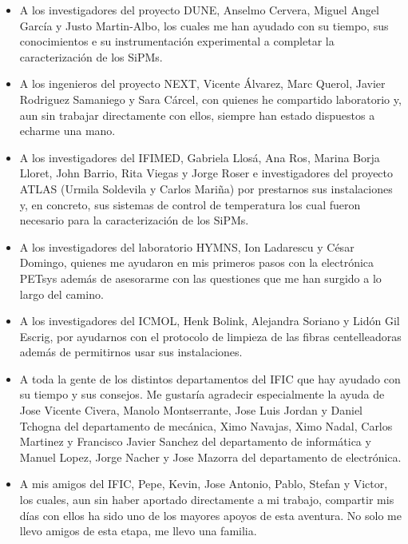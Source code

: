 \begin{itemize}

\item{} A los investigadores del proyecto DUNE, Anselmo Cervera, Miguel Angel García y Justo Martin-Albo, los cuales me han ayudado con su tiempo, sus conocimientos e su instrumentación experimental a completar la caracterización de los SiPMs. 

\item{} A los ingenieros del proyecto NEXT, Vicente Álvarez, Marc Querol, Javier Rodriguez Samaniego y Sara Cárcel, con quienes he compartido laboratorio y, aun sin trabajar directamente con ellos, siempre han estado dispuestos a echarme una mano. 

\item{} A los investigadores del IFIMED, Gabriela Llosá, Ana Ros, Marina Borja Lloret, John Barrio, Rita Viegas y Jorge Roser e investigadores del proyecto ATLAS (Urmila Soldevila y Carlos Mariña) por prestarnos sus instalaciones y, en concreto, sus sistemas de control de temperatura los cual fueron necesario para la caracterización de los SiPMs. 

\item{} A los investigadores del laboratorio HYMNS, Ion Ladarescu y César Domingo, quienes me ayudaron en mis primeros pasos con la electrónica PETsys además de asesorarme con las questiones que me han surgido a lo largo del camino.

\item{} A los investigadores del ICMOL, Henk Bolink, Alejandra Soriano y Lidón Gil Escrig, por ayudarnos con el protocolo de limpieza de las fibras centelleadoras además de permitirnos usar sus instalaciones.

\item{} A toda la gente de los distintos departamentos del IFIC que hay ayudado con su tiempo y sus consejos. Me gustaría agradecir especialmente la ayuda de Jose Vicente Civera, Manolo Montserrante, Jose Luis Jordan y Daniel Tchogna del departamento de mecánica, Ximo Navajas, Ximo Nadal, Carlos Martinez y Francisco Javier Sanchez del departamento de informática y Manuel Lopez, Jorge Nacher y Jose Mazorra del departamento de electrónica.

\item{} A mis amigos del IFIC, Pepe, Kevin, Jose Antonio, Pablo, Stefan y Victor, los cuales, aun sin haber aportado directamente a mi trabajo, compartir mis días con ellos ha sido uno de los mayores apoyos de esta aventura. No solo me llevo amigos de esta etapa, me llevo una familia.


\end{itemize}
